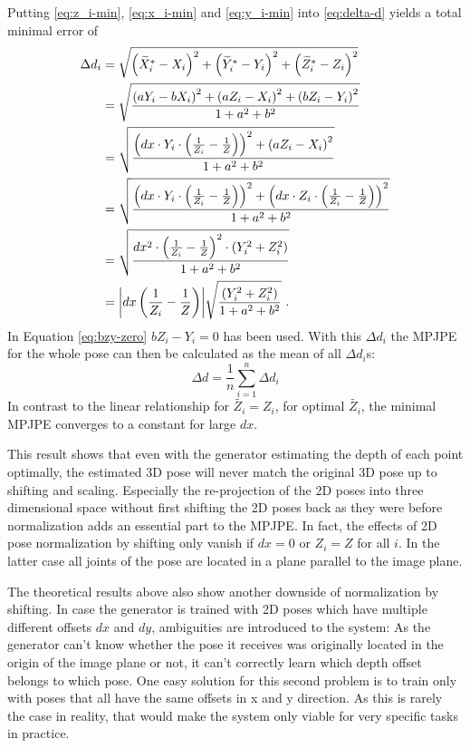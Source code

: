 Putting \eqref{eq:z_i-min}, \eqref{eq:x_i-min} and \eqref{eq:y_i-min} into \eqref{eq:delta-d} yields a total minimal error of 
\begin{align}
	\Delta d_i &= 
	\sqrt{\left (\widetilde{X}_i^\ast - X_i \right )^2 + \left (\widetilde{Y}_i^\ast - Y_i \right )^2 + \left (\widetilde{Z}_i^\ast - Z_i \right )^2}\\
	& = \sqrt{\frac{\left (a Y_i - b X_i \right )^2 + \left (a Z_i - X_i \right )^2 + \left (b Z_i - Y_i \right )^2}{1 + a^2 + b^2}} \\
	\label{eq:bzy-zero}
	&= \sqrt{\frac{\left (dx \cdot Y_i \cdot \left (\frac{1}{Z_i} - \frac{1}{Z} \right) \right)^2 + \left (a Z_i - X_i \right )^2}{1 + a^2 + b^2}}\\
	& = \sqrt{\frac{\left (dx \cdot Y_i \cdot \left (\frac{1}{Z_i} - \frac{1}{Z} \right ) \right)^2 + \left (dx \cdot Z_i \cdot \left (\frac{1}{Z_i} - \frac{1}{Z} \right ) \right)^2}{1 + a^2 + b^2}} \\
	& = \sqrt{\frac{dx^2 \cdot \left (\frac{1}{Z_i} - \frac{1}{Z} \right )^2 \cdot \left (Y_i^2 + Z_i^2 \right ) }{1 + a^2 + b^2}}\\
	\label{eq:minimum-delta-d}
	& = \abs{dx \left (\frac{1}{Z_i} - \frac{1}{Z} \right )} \sqrt{\frac{(Y_i^2 + Z_i^2)}{1 + a^2 + b^2}} \ .
\end{align}
In Equation \eqref{eq:bzy-zero} $b Z_i - Y_i = 0$ has been used.
With this $\Delta d_i$ the MPJPE for the whole pose can then be calculated as the mean of all $\Delta d_i$s:
\begin{equation}
	\label{eq:minimum-mpjpe-on-shift}
	\Delta d = \frac{1}{n} \sum_{i = 1}^{n} \Delta d_i 
\end{equation}
In contrast to the linear relationship for $\widetilde{Z_i} = Z_i$, for optimal $\widetilde{Z_i}$, the minimal MPJPE converges to a constant for large $dx$.

This result shows that even with the generator estimating the depth of each point optimally, the estimated 3D pose will never match the original 3D pose up to shifting and scaling.
Especially the re-projection of the 2D poses into three dimensional space without first shifting the 2D poses back as they were before normalization adds an essential part to the MPJPE.
In fact, the effects of 2D pose normalization by shifting only vanish if $dx = 0$ or $Z_i = Z$ for all $i$. 
In the latter case all joints of the pose are located in a plane parallel to the image plane.

The theoretical results above also show another downside of normalization by shifting.
In case the generator is trained with 2D poses which have multiple different offsets $dx$ and $dy$, ambiguities are introduced to the system:
As the generator can't know whether the pose it receives was originally located in the origin of the image plane or not, it can't correctly learn which depth offset belongs to which pose.
One easy solution for this second problem is to train only with poses that all have the same offsets in x and y direction.
As this is rarely the case in reality, that would make the system only viable for very specific tasks in practice.

